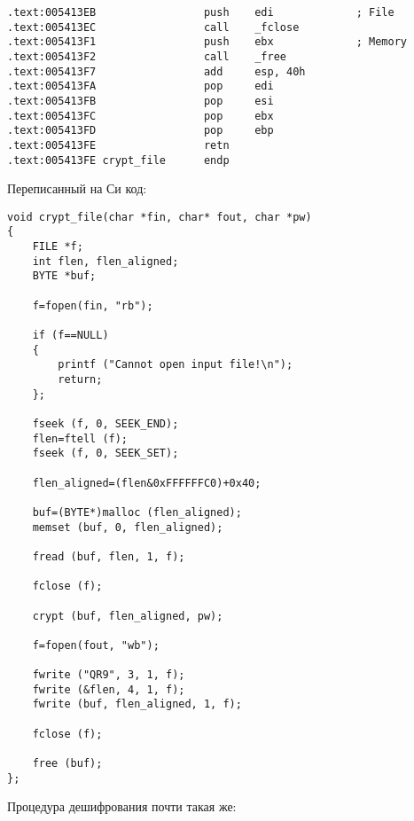 \begin{lstlisting}[style=customasm]
.text:005413EB                 push    edi             ; File
.text:005413EC                 call    _fclose
.text:005413F1                 push    ebx             ; Memory
.text:005413F2                 call    _free
.text:005413F7                 add     esp, 40h
.text:005413FA                 pop     edi
.text:005413FB                 pop     esi
.text:005413FC                 pop     ebx
.text:005413FD                 pop     ebp
.text:005413FE                 retn
.text:005413FE crypt_file      endp
\end{lstlisting}

Переписанный на Си код:

\begin{lstlisting}[style=customc]
void crypt_file(char *fin, char* fout, char *pw)
{
	FILE *f;
	int flen, flen_aligned;
	BYTE *buf;

	f=fopen(fin, "rb");
	
	if (f==NULL)
	{
		printf ("Cannot open input file!\n");
		return;
	};

	fseek (f, 0, SEEK_END);
	flen=ftell (f);
	fseek (f, 0, SEEK_SET);

	flen_aligned=(flen&0xFFFFFFC0)+0x40;

	buf=(BYTE*)malloc (flen_aligned);
	memset (buf, 0, flen_aligned);

	fread (buf, flen, 1, f);

	fclose (f);

	crypt (buf, flen_aligned, pw);
	
	f=fopen(fout, "wb");

	fwrite ("QR9", 3, 1, f);
	fwrite (&flen, 4, 1, f);
	fwrite (buf, flen_aligned, 1, f);

	fclose (f);

	free (buf);
};
\end{lstlisting}

Процедура дешифрования почти такая же:

